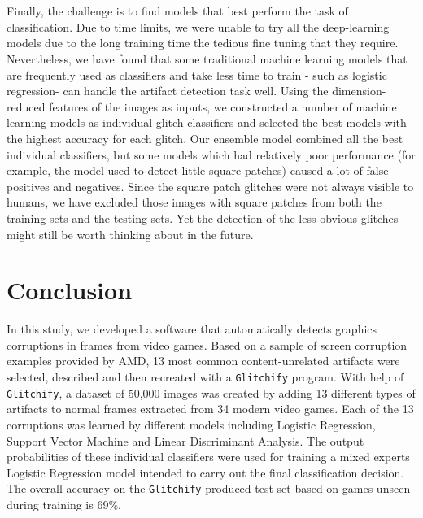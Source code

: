 \noindent
\\
\\
\noindent
Finally, the challenge is to find models that best perform the task of classification. Due to time limits, we were unable to try all the deep-learning models due to the long training time the tedious fine tuning that they require. Nevertheless, we have found that some traditional machine learning models that are frequently used as classifiers and take less time to train - such as logistic regression- can handle the artifact detection task well. Using the dimension-reduced features of the images as inputs, we constructed a number of machine learning models as individual glitch classifiers and selected the best models with the highest accuracy for each glitch. Our ensemble model combined all the best individual classifiers, but some models which had relatively poor performance (for example, the model used to detect little square patches) caused a lot of false positives and negatives. Since the square patch glitches were not always visible to humans, we have excluded those images with square patches from both the training sets and the testing sets. Yet the detection of the less obvious glitches might still be worth thinking about in the future.



\section{Conclusion}
In this study, we developed a software that automatically detects graphics corruptions in frames from video games. Based on a sample of screen corruption examples provided by AMD, 13 most common content-unrelated artifacts were selected, described and then recreated with a \texttt{Glitchify} program. With help of \texttt{Glitchify}, a dataset of 50,000 images was created by adding 13 different types of artifacts to normal frames extracted from 34 modern video games. Each of the 13 corruptions was learned by different models including Logistic Regression, Support Vector Machine and Linear Discriminant Analysis. The output probabilities of these individual classifiers were used for training a mixed experts Logistic Regression model intended to carry out the final classification decision. The overall accuracy on the \texttt{Glitchify}-produced test set based on games unseen during training is 69\%. 


